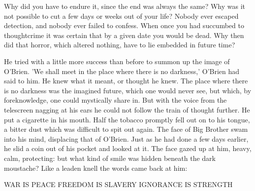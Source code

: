 \documentclass{article}
\begin{document}
Why did you have to endure it, since the end was always the same? Why was
it not possible to cut a few days or weeks out of your life? Nobody ever
escaped detection, and nobody ever failed to confess. When once you had
succumbed to thoughtcrime it was certain that by a given date you would be
dead. Why then did that horror, which altered nothing, have to lie embedded
in future time?

He tried with a little more success than before to summon up the image of
O'Brien. 'We shall meet in the place where there is no darkness,' O'Brien
had said to him. He knew what it meant, or thought he knew. The place where
there is no darkness was the imagined future, which one would never see,
but which, by foreknowledge, one could mystically share in. But with the
voice from the telescreen nagging at his ears he could not follow the train
of thought further. He put a cigarette in his mouth. Half the tobacco
promptly fell out on to his tongue, a bitter dust which was difficult to
spit out again. The face of Big Brother swam into his mind, displacing that
of O'Brien. Just as he had done a few days earlier, he slid a coin out of
his pocket and looked at it. The face gazed up at him, heavy, calm,
protecting: but what kind of smile was hidden beneath the dark moustache?
Like a leaden knell the words came back at him:


  WAR IS PEACE
  FREEDOM IS SLAVERY
  IGNORANCE IS STRENGTH
\end{document}
